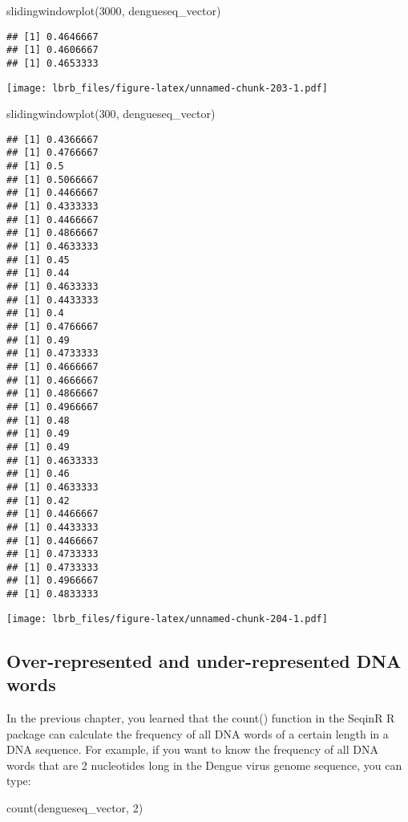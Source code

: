 \documentclass[
]{book}
\newenvironment{Shaded}{\begin{snugshade}}{\end{snugshade}}
\newcommand{\DecValTok}[1]{\textcolor[rgb]{0.00,0.00,0.81}{#1}}
\newcommand{\FunctionTok}[1]{\textcolor[rgb]{0.00,0.00,0.00}{#1}}
\newcommand{\NormalTok}[1]{#1}
\begin{document}
\begin{Shaded}
\begin{Highlighting}[]
 \FunctionTok{slidingwindowplot}\NormalTok{(}\DecValTok{3000}\NormalTok{, dengueseq\_vector)}
\end{Highlighting}
\end{Shaded}

\begin{verbatim}
## [1] 0.4646667
## [1] 0.4606667
## [1] 0.4653333
\end{verbatim}

\texttt{[image: lbrb\_files/figure-latex/unnamed-chunk-203-1.pdf]}

\begin{Shaded}
\begin{Highlighting}[]
 \FunctionTok{slidingwindowplot}\NormalTok{(}\DecValTok{300}\NormalTok{, dengueseq\_vector)}
\end{Highlighting}
\end{Shaded}

\begin{verbatim}
## [1] 0.4366667
## [1] 0.4766667
## [1] 0.5
## [1] 0.5066667
## [1] 0.4466667
## [1] 0.4333333
## [1] 0.4466667
## [1] 0.4866667
## [1] 0.4633333
## [1] 0.45
## [1] 0.44
## [1] 0.4633333
## [1] 0.4433333
## [1] 0.4
## [1] 0.4766667
## [1] 0.49
## [1] 0.4733333
## [1] 0.4666667
## [1] 0.4666667
## [1] 0.4866667
## [1] 0.4966667
## [1] 0.48
## [1] 0.49
## [1] 0.49
## [1] 0.4633333
## [1] 0.46
## [1] 0.4633333
## [1] 0.42
## [1] 0.4466667
## [1] 0.4433333
## [1] 0.4466667
## [1] 0.4733333
## [1] 0.4733333
## [1] 0.4966667
## [1] 0.4833333
\end{verbatim}

\texttt{[image: lbrb\_files/figure-latex/unnamed-chunk-204-1.pdf]}

\hypertarget{over-represented-and-under-represented-dna-words}{%
\subsection{Over-represented and under-represented DNA words}\label{over-represented-and-under-represented-dna-words}}

In the previous chapter, you learned that the count() function in the SeqinR R package can calculate the frequency of all DNA words of a certain length in a DNA sequence. For example, if you want to know the frequency of all DNA words that are 2 nucleotides long in the Dengue virus genome sequence, you can type:

\begin{Shaded}
\begin{Highlighting}[]
 \FunctionTok{count}\NormalTok{(dengueseq\_vector, }\DecValTok{2}\NormalTok{)}
\end{Highlighting}
\end{Shaded}
\end{document}
